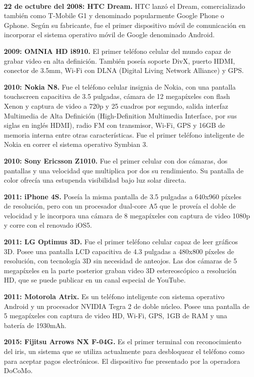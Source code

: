 \\ \par
\textbf{22 de octubre del 2008: HTC Dream.}
HTC lanzó el Dream, comercializado también como T-Mobile G1 y denominado popularmente Google Phone o Gphone. Según su fabricante, fue el primer dispositivo móvil de comunicación en incorporar el sistema operativo móvil de Google denominado Android.
\\ \par
\textbf{2009: OMNIA HD i8910.}
El primer teléfono celular del mundo capaz de grabar video en alta definición. También poseía soporte DivX, puerto HDMI, conector de 3.5mm, Wi-Fi con DLNA (Digital Living Network Alliance) y GPS.
\\ \par
\textbf{2010: Nokia N8.}
Fue el teléfono celular insignia de Nokia, con una pantalla touchscreen capacitiva de 3.5 pulgadas, cámara de 12 megapíxeles con flash Xenon y captura de video a 720p y 25 cuadros por segundo, salida interfaz Multimedia de Alta Definición (High-Definition Multimedia Interface, por sus siglas en inglés HDMI), radio FM con transmisor, Wi-Fi, GPS y 16GB de memoria interna entre otras características. Fue el primer teléfono inteligente de Nokia en correr el sistema operativo Symbian 3.
\\ \par
\textbf{2010: Sony Ericsson Z1010.}
Fue el primer celular con dos cámaras, dos pantallas y una velocidad que multiplica por dos su rendimiento. Su pantalla de color ofrecía una estupenda visibilidad bajo luz solar directa.
\\ \par
\textbf{2011: iPhone 4S.}
Poseía la misma pantalla de 3.5 pulgadas a 640x960 píxeles de resolución, pero con un procesador dual-core A5 que le proveía el doble de velocidad y le incorpora una cámara de 8 megapíxeles con captura de video 1080p y corre con el renovado iOS5.
\\ \par
\textbf{2011: LG Optimus 3D.}
Fue el primer teléfono celular capaz de leer gráficos 3D. Posee una pantalla LCD capacitiva de 4.3 pulgadas a 480x800 píxeles de resolución, con tecnología 3D sin necesidad de anteojos. Las dos cámaras de 5 megapíxeles en la parte posterior graban video 3D estereoscópico a resolución HD, que se puede publicar en un canal especial de YouTube.
\\ \par
\textbf{2011: Motorola Atrix.}
Es un teléfono inteligente con sistema operativo Android y un procesador NVIDIA Tegra 2 de doble núcleo. Posee una pantalla de 5 megapíxeles con captura de video HD, Wi-Fi, GPS, 1GB de RAM y una batería de 1930mAh.
\\ \par
\textbf{2015: Fijitsu Arrows NX F-04G.}
Es el primer terminal con reconocimiento del iris, un sistema que se utiliza actualmente para desbloquear el teléfono como para aceptar pagos electrónicos. El dispositivo fue presentado por la operadora DoCoMo. \\
